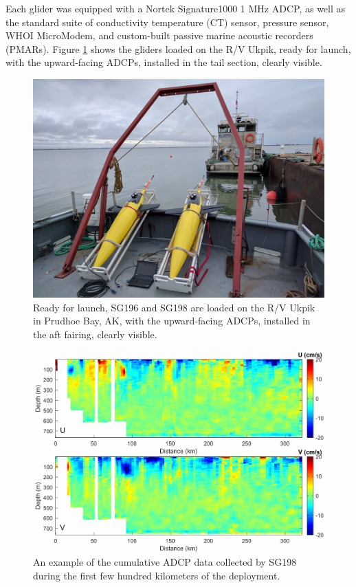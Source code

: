 Each glider was equipped with a Nortek Signature1000 1 MHz ADCP, as well as the standard suite of conductivity temperature (CT) sensor, pressure sensor, WHOI MicroModem, and custom-built passive marine acoustic recorders (PMARs). Figure \ref{fig:SG} shows the gliders loaded on the R/V Ukpik, ready for launch, with the upward-facing ADCPs, installed in the tail section, clearly visible.

\begin{figure}%
  \centering
  \includegraphics[width=0.9\columnwidth]{./figs/UkpikGliders.jpg}
  \caption{Ready for launch, SG196 and SG198 are loaded on the R/V Ukpik in Prudhoe Bay, AK, with the upward-facing ADCPs, installed in the aft fairing, clearly visible. }
  \label{fig:SG}
  \vspace{-0.2in}
\end{figure}

\begin{figure}%
  \centering
  \includegraphics[width=0.9\columnwidth]{./figs/CABAGE_sg198_ADCP_quicklook.png}
  \caption{An example of the cumulative ADCP data collected by SG198 during the first few hundred kilometers of the deployment.}
  \label{fig:ADCP}
\end{figure}

